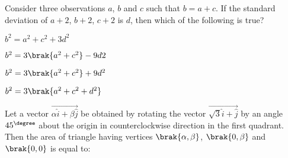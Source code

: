 \iffalse
\title{Assignment-1}
\author{EE24BTECH11049}
\section{mcq-single}
\fi
%
    
    \item 
    Consider three observations $a$, $b$ and $c$ such that $b = a+c$. If the standard deviation of $a+2$, $b+2$, $c+2$ is $d$, then which of the following is true?

    \hfill{}
    
    \begin{enumerate}
    \begin{multicols}{2}
        \item $b^2 = a^2 + c^2 + 3d^2$
        \item $b^2 = 3 \brak{a^2 + c^2} - 9d2$
        \item $b^2 = 3 \brak{a^2 + c^2} + 9d^2$
        \item $b^2 = 3 \brak{a^2 + c^2 + d^2}$
    \end{multicols}
    \end{enumerate}
    
    \item 
    Let a vector $\vec{\alpha\hat{i} + \beta\hat{j}}$ be obtained by rotating the vector $\vec{\sqrt{3}\hat{i} + \hat{j}}$ by an angle $45^{\degree}$ about the origin in counterclockwise direction in the first quadrant. Then the area of triangle having vertices $\brak{\alpha, \beta}$, $\brak{0, \beta}$ and $\brak{0, 0}$ is equal to:
    \hfill{}
    

